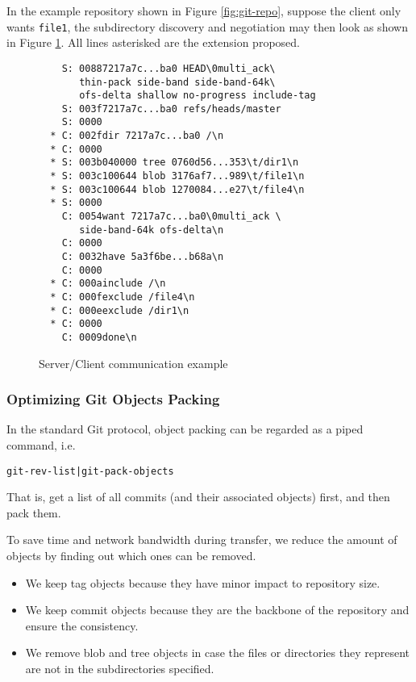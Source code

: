 \documentclass[copyrightwanted=false]{sigplanconf}
\begin{document}
In the example repository shown in Figure \ref{fig:git-repo}, suppose the
client only wants \verb|file1|, the subdirectory discovery and negotiation may
then look as shown in Figure \ref{fig:c/s-comm}.
All lines asterisked are the extension proposed.

\begin{figure}[htpb]
  \centering
  \begin{verbatim}
    S: 00887217a7c...ba0 HEAD\0multi_ack\
       thin-pack side-band side-band-64k\
       ofs-delta shallow no-progress include-tag
    S: 003f7217a7c...ba0 refs/heads/master
    S: 0000
  * C: 002fdir 7217a7c...ba0 /\n
  * C: 0000
  * S: 003b040000 tree 0760d56...353\t/dir1\n
  * S: 003c100644 blob 3176af7...989\t/file1\n
  * S: 003c100644 blob 1270084...e27\t/file4\n
  * S: 0000
    C: 0054want 7217a7c...ba0\0multi_ack \
       side-band-64k ofs-delta\n
    C: 0000
    C: 0032have 5a3f6be...b68a\n
    C: 0000
  * C: 000ainclude /\n
  * C: 000fexclude /file4\n
  * C: 000eexclude /dir1\n
  * C: 0000
    C: 0009done\n
  \end{verbatim}
  \caption{Server/Client communication example}
  \label{fig:c/s-comm}
\end{figure}

\subsubsection{Optimizing Git Objects Packing}
In the standard Git protocol, object packing can be regarded as a piped command,
i.e.
\begin{verbatim}
git-rev-list|git-pack-objects
\end{verbatim}
That is, get a list of all commits (and their associated objects) first, and then
pack them.

To save time and network bandwidth during transfer, we reduce the amount of objects
by finding out which ones can be removed.
\begin{itemize}
  \item We keep tag objects because they have minor impact to repository size.

  \item We keep commit objects because they are the backbone of the repository
    and ensure the consistency.

  \item We remove blob and tree objects in case the files or directories they
    represent are not in the subdirectories specified.

\end{itemize}
\end{document}
